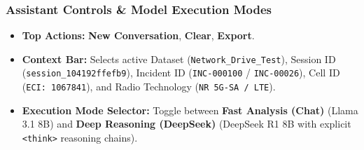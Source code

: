 \documentclass[12pt,a4paper]{report}
\begin{document}
\subsubsection{Assistant Controls \& Model Execution Modes}
\begin{itemize}
    \item \textbf{Top Actions:} \textbf{New Conversation}, \textbf{Clear}, \textbf{Export}.
    \item \textbf{Context Bar:} Selects active Dataset (\texttt{Network\_Drive\_Test}), Session ID (\texttt{session\_104192ffefb9}), Incident ID (\texttt{INC-000100} / \texttt{INC-00026}), Cell ID (\texttt{ECI: 1067841}), and Radio Technology (\texttt{NR 5G-SA / LTE}).
    \item \textbf{Execution Mode Selector:} Toggle between \textbf{Fast Analysis (Chat)} (Llama 3.1 8B) and \textbf{Deep Reasoning (DeepSeek)} (DeepSeek R1 8B with explicit \texttt{<think>} reasoning chains).
\end{itemize}
\end{document}
